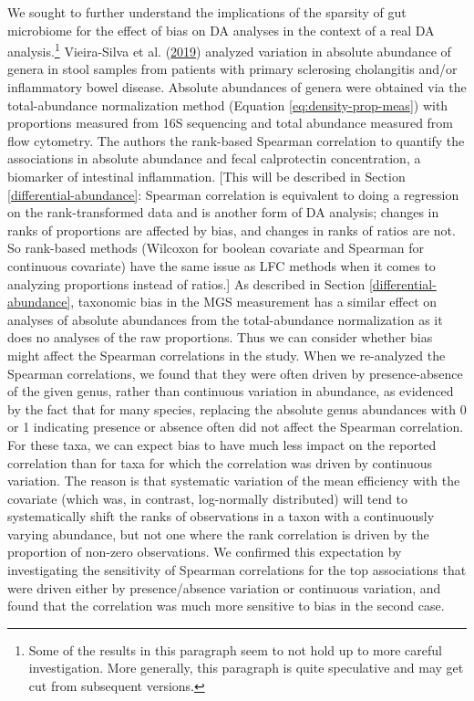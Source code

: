 \documentclass[
]{article}
\begin{document}
We sought to further understand the implications of the sparsity of gut microbiome for the effect of bias on DA analyses in the context of a real DA analysis.\footnote{Some of the results in this paragraph seem to not hold up to more careful investigation. More generally, this paragraph is quite speculative and may get cut from subsequent versions.}
Vieira-Silva et al. (\protect\hyperlink{ref-vieirasilva2019quan}{2019}) analyzed variation in absolute abundance of genera in stool samples from patients with primary sclerosing cholangitis and/or inflammatory bowel disease.
Absolute abundances of genera were obtained via the total-abundance normalization method (Equation \eqref{eq:density-prop-meas}) with proportions measured from 16S sequencing and total abundance measured from flow cytometry.
The authors the rank-based Spearman correlation to quantify the associations in absolute abundance and fecal calprotectin concentration, a biomarker of intestinal inflammation.
{[}This will be described in Section \ref{differential-abundance}: Spearman correlation is equivalent to doing a regression on the rank-transformed data and is another form of DA analysis; changes in ranks of proportions are affected by bias, and changes in ranks of ratios are not. So rank-based methods (Wilcoxon for boolean covariate and Spearman for continuous covariate) have the same issue as LFC methods when it comes to analyzing proportions instead of ratios.{]}
As described in Section \ref{differential-abundance}, taxonomic bias in the MGS measurement has a similar effect on analyses of absolute abundances from the total-abundance normalization as it does no analyses of the raw proportions.
Thus we can consider whether bias might affect the Spearman correlations in the study.
When we re-analyzed the Spearman correlations, we found that they were often driven by presence-absence of the given genus, rather than continuous variation in abundance, as evidenced by the fact that for many species, replacing the absolute genus abundances with 0 or 1 indicating presence or absence often did not affect the Spearman correlation.
For these taxa, we can expect bias to have much less impact on the reported correlation than for taxa for which the correlation was driven by continuous variation.
The reason is that systematic variation of the mean efficiency with the covariate (which was, in contrast, log-normally distributed) will tend to systematically shift the ranks of observations in a taxon with a continuously varying abundance, but not one where the rank correlation is driven by the proportion of non-zero observations.
We confirmed this expectation by investigating the sensitivity of Spearman correlations for the top associations that were driven either by presence/absence variation or continuous variation, and found that the correlation was much more sensitive to bias in the second case.
\end{document}
